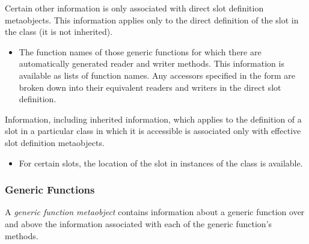 Certain other information is only associated with direct slot definition
metaobjects. This information applies only to the direct definition of the slot
in the class (it is not inherited). 


  \begin{itemize}
  \item 
    The function names of those generic functions for which there are
    automatically generated reader and writer methods. This information is
    available as lists of function names. Any accessors specified in the
     form are broken down into their equivalent readers and writers in
    the direct slot definition.
  \end{itemize}


Information, including inherited information, which applies to the definition of
a slot in a particular class in which it is accessible is associated only with
effective slot definition metaobjects. 


  \begin{itemize}
  \item 
    For certain slots, the location of the slot in instances of the class is
    available.
  \end{itemize}


\subsubsection{Generic Functions}

A \emph{generic function metaobject} contains information about a generic function over
and above the information associated with each of the generic function's
methods. 


